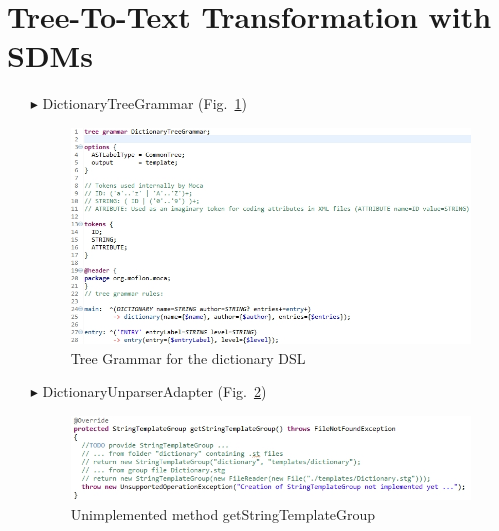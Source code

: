 \section{Tree-To-Text Transformation with SDMs}
\begin{enumerate}
\item[$\blacktriangleright$] DictionaryTreeGrammar
  (Fig.~\ref{fig:moca-DictionaryTreeGrammar})    
\begin{figure}[!htbp]
\begin{center}
 \includegraphics[width=\textwidth]{pics/moca/5MocaTreeToText/DictionaryTreeGrammar}
  \caption{Tree Grammar for the dictionary DSL} 
  \label{fig:moca-DictionaryTreeGrammar}
\end{center}
\end{figure} 

\item[$\blacktriangleright$] DictionaryUnparserAdapter
  (Fig.~\ref{fig:moca-DictionaryUnparserAdapter})    
  
\begin{figure}[!htbp]
\begin{center}
 \includegraphics[width=\textwidth]{pics/moca/5MocaTreeToText/UnparserAdapterNotImplemented}
  \caption{Unimplemented method getStringTemplateGroup} 
  \label{fig:moca-DictionaryUnparserAdapter}
\end{center}
\end{figure} 
 

\end{enumerate}

